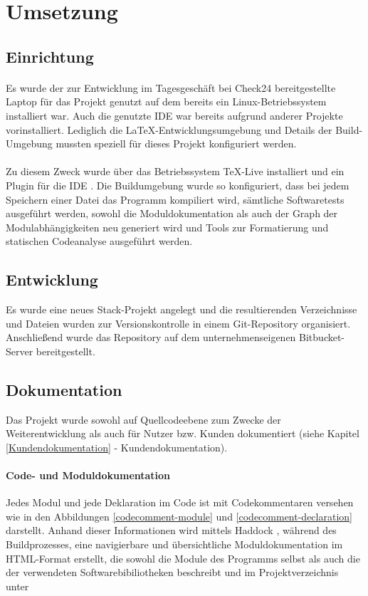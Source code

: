 \section{Umsetzung}

\subsection{Einrichtung}
\paragraph{}
Es wurde der zur Entwicklung im Tagesgeschäft bei Check24 bereitgestellte Laptop
für das Projekt genutzt auf dem bereits ein Linux-Betriebssystem installiert war.
Auch die genutzte \gls{IDE} war bereits aufgrund anderer Projekte vorinstalliert.
Lediglich die \LaTeX-Entwicklungsumgebung und Details der Build-Umgebung mussten
speziell für dieses Projekt konfiguriert werden.

\paragraph{}
Zu diesem Zweck wurde über das Betriebssystem \TeX-Live \cite{texlive} installiert
und ein Plugin für die \gls{IDE} \cite{latex-workshop}. Die Buildumgebung
wurde so konfiguriert, dass bei jedem Speichern einer Datei das Programm kompiliert wird,
sämtliche Softwaretests ausgeführt werden, sowohl die Moduldokumentation als auch
der Graph der Modulabhängigkeiten neu generiert wird und Tools zur Formatierung
und statischen Codeanalyse ausgeführt werden.

\subsection{Entwicklung}
Es wurde eine neues Stack\cite{stack}-Projekt angelegt und die resultierenden
Verzeichnisse und Dateien wurden zur Versionskontrolle in einem Git\cite{git}-Repository organisiert.
Anschließend wurde das Repository auf dem unternehmenseigenen Bitbucket-Server \cite{bitbucket}
bereitgestellt.

\subsection{Dokumentation}
Das Projekt wurde sowohl auf Quellcodeebene zum Zwecke der Weiterentwicklung als
auch für Nutzer bzw. Kunden dokumentiert (siehe Kapitel \ref{Kundendokumentation} - Kundendokumentation).

\paragraph{Code- und Moduldokumentation}
Jedes Modul und jede Deklaration im Code ist mit Codekommentaren versehen wie in
den Abbildungen \ref{codecomment-module} und \ref{codecomment-declaration} darstellt.
Anhand dieser Informationen wird mittels Haddock \cite{haddock}, während des Buildprozesses,
eine navigierbare und übersichtliche Moduldokumentation im HTML-Format erstellt,
die sowohl die Module des Programms selbst als auch die der verwendeten Softwarebibiliotheken
beschreibt und im Projektverzeichnis unter

